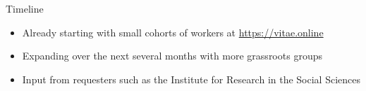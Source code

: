 \documentclass[presentation]{subfiles}
\begin{document}
\begin{frame}{Timeline}

  \begin{itemize}
    \item<+-> Already starting with small cohorts of workers at \url{https://vitae.online}
    \item<+-> Expanding over the next several months with more grassroots groups
    \item<+-> Input from requesters such as the Institute for Research in the Social Sciences
  \end{itemize}

\end{frame}
\end{document}

